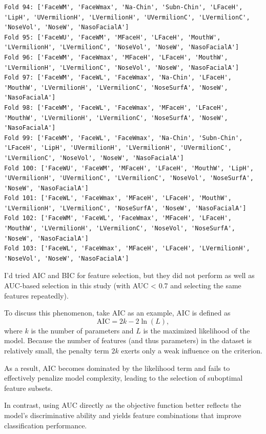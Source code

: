 \documentclass[12pt,a4paper]{article}
\begin{document}
\begin{verbatim}
Fold 94: ['FaceWM', 'FaceWmax', 'Na-Chin', 'Subn-Chin', 'LFaceH', 'LipH', 'UVermilionH', 'LVermilionH', 'UVermilionC', 'LVermilionC', 'NoseVol', 'NoseW', 'NasoFacialA']
Fold 95: ['FaceWU', 'FaceWM', 'MFaceH', 'LFaceH', 'MouthW', 'LVermilionH', 'LVermilionC', 'NoseVol', 'NoseW', 'NasoFacialA']
Fold 96: ['FaceWM', 'FaceWmax', 'MFaceH', 'LFaceH', 'MouthW', 'LVermilionH', 'LVermilionC', 'NoseVol', 'NoseW', 'NasoFacialA']
Fold 97: ['FaceWM', 'FaceWL', 'FaceWmax', 'Na-Chin', 'LFaceH', 'MouthW', 'LVermilionH', 'LVermilionC', 'NoseSurfA', 'NoseW', 'NasoFacialA']
Fold 98: ['FaceWM', 'FaceWL', 'FaceWmax', 'MFaceH', 'LFaceH', 'MouthW', 'LVermilionH', 'LVermilionC', 'NoseSurfA', 'NoseW', 'NasoFacialA']
Fold 99: ['FaceWM', 'FaceWL', 'FaceWmax', 'Na-Chin', 'Subn-Chin', 'LFaceH', 'LipH', 'UVermilionH', 'LVermilionH', 'UVermilionC', 'LVermilionC', 'NoseVol', 'NoseW', 'NasoFacialA']
Fold 100: ['FaceWU', 'FaceWM', 'MFaceH', 'LFaceH', 'MouthW', 'LipH', 'UVermilionH', 'UVermilionC', 'LVermilionC', 'NoseVol', 'NoseSurfA', 'NoseW', 'NasoFacialA']
Fold 101: ['FaceWL', 'FaceWmax', 'MFaceH', 'LFaceH', 'MouthW', 'LVermilionH', 'LVermilionC', 'NoseSurfA', 'NoseW', 'NasoFacialA']
Fold 102: ['FaceWM', 'FaceWL', 'FaceWmax', 'MFaceH', 'LFaceH', 'MouthW', 'LVermilionH', 'LVermilionC', 'NoseVol', 'NoseSurfA', 'NoseW', 'NasoFacialA']
Fold 103: ['FaceWL', 'FaceWmax', 'MFaceH', 'LFaceH', 'LVermilionH', 'NoseVol', 'NoseW', 'NasoFacialA']
\end{verbatim}

I'd tried AIC and BIC for feature selection, but they did not perform as well as AUC-based selection in this study (with AUC < 0.7 and selecting the same features repeatedly). 

To discuss this phenomenon, take AIC as an example, AIC is defined as
\begin{equation}
\text{AIC} = 2k - 2\ln(L),
\end{equation}
where $k$ is the number of parameters and $L$ is the maximized likelihood of the model.  Because the number of features (and thus parameters) in the dataset is relatively small, the penalty term $2k$ exerts only a weak influence on the criterion. 

As a result, AIC becomes dominated by the likelihood term and fails to effectively penalize model complexity, leading to the selection of suboptimal feature subsets. 

In contrast, using AUC directly as the objective function better reflects the model's discriminative ability and yields feature combinations that improve classification performance.
\end{document}
